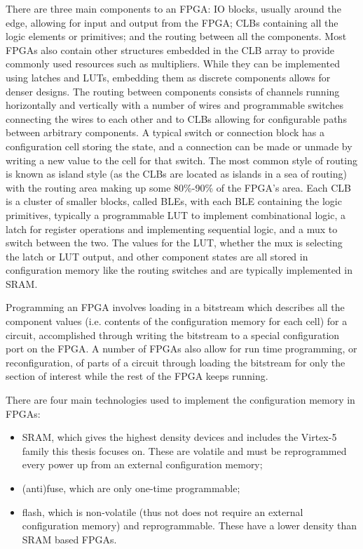 \documentclass[12pt,final,oneside]{dwThesis} %
\begin{document}
   There are three main components to an \gls{FPGA}: \gls{IO} blocks, usually around the edge, allowing for input and output from the \gls{FPGA}; \glspl{CLB} containing all the logic elements or \glspl{primitive}; and the routing between all the components.
   Most \glspl{FPGA} also contain other structures embedded in the \gls{CLB} array to provide commonly used resources such as multipliers. While they can be implemented using latches and \glspl{LUT}, embedding them as discrete components allows for denser designs.
   The routing between components consists of channels running horizontally and vertically with a number of wires and programmable switches connecting the wires to each other and to \glspl{CLB} allowing for configurable paths between arbitrary components. A typical switch or connection block has a configuration cell storing the state, and a connection can be made or unmade by writing a new value to the cell for that switch. The most common style of routing is known as island style (as the \glspl{CLB} are located as islands in a sea of routing) with the routing area making up some 80\%-90\% of the \gls{FPGA}'s area\cite{FPGAArch}.
   Each \gls{CLB} is a cluster of smaller blocks, called \glspl{BLE}, with each \gls{BLE} containing the logic primitives, typically a programmable \gls{LUT} to implement combinational logic, a latch for register operations and implementing sequential logic, and a \gls{mux} to switch between the two. The values for the \gls{LUT}, whether the \gls{mux} is selecting the latch or \gls{LUT} output, and other component states are all stored in configuration memory like the routing switches and are typically implemented in \gls{SRAM}.

   Programming an \gls{FPGA} involves loading in a bitstream which describes all the component values (i.e. contents of the configuration memory for each cell) for a circuit, accomplished through writing the bitstream to a special configuration port on the \gls{FPGA}. A number of \glspl{FPGA} also allow for run time programming, or reconfiguration, of parts of a circuit through loading the bitstream for only the section of interest while the rest of the \gls{FPGA} keeps running.

   There are four main technologies used to implement the configuration memory in \glspl{FPGA}:
   \begin{itemize}
      \item \gls{SRAM}, which gives the highest density devices and includes the Virtex-5 family this thesis focuses on. These are volatile and must be reprogrammed every power up from an external configuration memory;
      \item (anti)fuse, which are only one-time programmable;
      \item flash, which is non-volatile (thus not does not require an external configuration memory) and reprogrammable. These have a lower density than \gls{SRAM} based \glspl{FPGA}\cite{FPGAArch}.
   \end{itemize}
\end{document}
